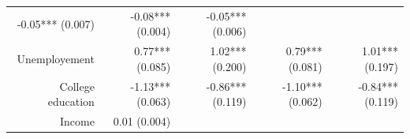 \documentclass[]{article}
\begin{document}
\begin{longtable}[c]{@{}rrrrr@{}}
\begin{minipage}[t]{0.16\columnwidth}
-0.05*** (0.007)
\strut\end{minipage} &
\begin{minipage}[t]{0.21\columnwidth}\raggedleft\strut
-0.08*** (0.004)
\strut\end{minipage} &
\begin{minipage}[t]{0.15\columnwidth}\raggedleft\strut
-0.05*** (0.006)
\strut\end{minipage}\tabularnewline
\begin{minipage}[t]{0.17\columnwidth}\raggedleft\strut
Unemployement
\strut\end{minipage} &
\begin{minipage}[t]{0.18\columnwidth}\raggedleft\strut
0.77*** (0.085)
\strut\end{minipage} &
\begin{minipage}[t]{0.16\columnwidth}\raggedleft\strut
1.02*** (0.200)
\strut\end{minipage} &
\begin{minipage}[t]{0.21\columnwidth}\raggedleft\strut
0.79*** (0.081)
\strut\end{minipage} &
\begin{minipage}[t]{0.15\columnwidth}\raggedleft\strut
1.01*** (0.197)
\strut\end{minipage}\tabularnewline
\begin{minipage}[t]{0.17\columnwidth}\raggedleft\strut
College education
\strut\end{minipage} &
\begin{minipage}[t]{0.18\columnwidth}\raggedleft\strut
-1.13*** (0.063)
\strut\end{minipage} &
\begin{minipage}[t]{0.16\columnwidth}\raggedleft\strut
-0.86*** (0.119)
\strut\end{minipage} &
\begin{minipage}[t]{0.21\columnwidth}\raggedleft\strut
-1.10*** (0.062)
\strut\end{minipage} &
\begin{minipage}[t]{0.15\columnwidth}\raggedleft\strut
-0.84*** (0.119)
\strut\end{minipage}\tabularnewline
\begin{minipage}[t]{0.17\columnwidth}\raggedleft\strut
Income
\strut\end{minipage} &
\begin{minipage}[t]{0.18\columnwidth}\raggedleft\strut
0.01 (0.004)
\strut\end{minipage} &
\begin{minipage}[t]{0.16\columnwidth}\raggedleft\strut

\end{minipage}
\end{longtable}
\end{document}
